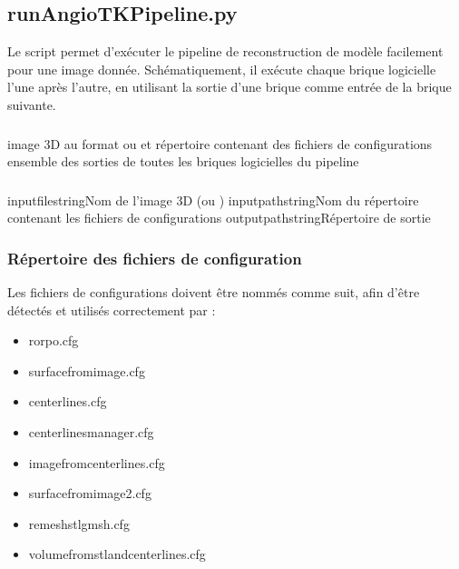 	\subsection{runAngioTKPipeline.py}
	\label{pipeline:run}
	
Le script \runpy permet d'exécuter le pipeline de reconstruction de modèle facilement pour une image donnée. Schématiquement, il exécute chaque brique logicielle l'une après l'autre, en utilisant la sortie d'une brique comme entrée de la brique suivante.

	\subsubsection{\ioT}

\iolist
{image 3D au format \mha ou \nii et répertoire contenant des fichiers de configurations}
{ensemble des sorties de toutes les briques logicielles du pipeline}


	\subsubsection{\argsT}

\args
{inputfile}{}{string}{Nom de l'image 3D (\mha ou \nii)}
{inputpath}{}{string}{Nom du répertoire contenant les fichiers de configurations}
{outputpath}{}{string}{Répertoire de sortie}
\stoparg


	\subsubsection{Répertoire des fichiers de configuration}
Les fichiers de configurations doivent être nommés comme suit, afin d'être détectés et utilisés correctement par \runpy:

\begin{itemize}
	\item rorpo.cfg
	\item surfacefromimage.cfg
	\item centerlines.cfg
	\item centerlinesmanager.cfg
	\item imagefromcenterlines.cfg
	\item surfacefromimage2.cfg
	\item remeshstlgmsh.cfg
	\item volumefromstlandcenterlines.cfg
\end{itemize}



